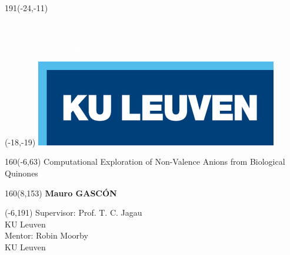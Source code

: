 \documentclass[12pt,a4paper,oneside]{book}
\begin{document}
\thispagestyle{empty}
\newcommand{\form}[1]{\scalebox{1.087}{\boldmath{#1}}}
\sffamily %
%
\begin{textblock}{191}(-24,-11)
\colorbox{bluetitle}{\hspace{139mm}\ \parbox[c][18truemm]{52mm}{\textcolor{white}{FACULTY OF SCIENCE}}}
\end{textblock}
%
\begin{textblock}{70}(-18,-19)
\textblockcolour{}
\includegraphics*[height=19.8truemm]{LogoKULeuven}
\end{textblock}
%
\begin{textblock}{160}(-6,63)
\textblockcolour{}
\vspace{-\parskip}
\flushleft
\fontsize{35}{37}\selectfont \textcolor{bluetitle}{Computational Exploration of Non-Valence Anions from Biological Quinones}\\[1.5mm]
\end{textblock}
%
\begin{textblock}{160}(8,153)
\textblockcolour{}
\vspace{-\parskip}
\flushright
\fontsize{14}{16}\selectfont \textbf{Mauro GASC{\'O}N}
\end{textblock}
%
\begin{textblock}{70}(-6,191)
\textblockcolour{}
\vspace{-\parskip}
\flushleft
Supervisor: Prof. T. C. Jagau\\[-2pt]
\textcolor{blueaff}{KU Leuven}\\[5pt]
Mentor: Robin Moorby\\[-2pt]
\textcolor{blueaff}{KU Leuven}\\
\end{textblock}
\end{document}
